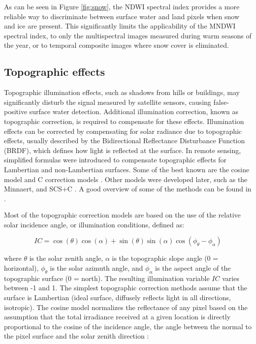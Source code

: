 As can be seen in Figure \ref{fig:snow}, the \gls{NDWI} spectral index provides a more reliable way to discriminate between surface water and land pixels when snow and ice are present. This significantly limits the applicability of the \gls{MNDWI} spectral index, to only the multispectral images measured during warm seasons of the year, or to temporal composite images where snow cover is eliminated.

\subsection{Topographic effects}

Topographic illumination effects, such as shadows from hills or buildings, may significantly disturb the signal measured by satellite sensors, causing false-positive surface water detection. Additional illumination correction, known as topographic correction, is required to compensate for these effects. Illumination effects can be corrected by compensating for solar radiance due to topographic effects, usually described by the Bidirectional Reflectance Disturbance Function (BRDF), which defines how light is reflected at the surface. In remote sensing, simplified formulas were introduced to compensate topographic effects for Lambertian and non-Lambertian surfaces. Some of the best known are the cosine model and C correction models \citet{teillet1982slope}. Other models were developed later, such as the Minnaert, and SCS+C \citet{smith1980lambertian, teillet1982slope}. A good overview of some of the methods can be found in \citet{gao2009simple, soenen2005scs+}. 

Most of the topographic correction models are based on the use of the relative solar incidence angle, or illumination conditions, defined as: 

\begin{equation}
\label{eq:ic}
IC = \cos(\theta) \cos(\alpha) + \sin(\theta) \sin(\alpha) \cos(\phi_{\theta} - \phi_{\alpha})
\end{equation}

where $\theta$ is the solar zenith angle, $\alpha$ is the topographic slope angle (0 = horizontal), $\phi_{\theta}$ is the solar azimuth angle, and $\phi_{\alpha}$ is the aspect angle of the topographic surface (0 = north). The resulting illumination variable $IC$ varies between -1 and 1. The simplest topographic correction methods assume that the surface is Lambertian (ideal surface, diffusely reflects light in all directions, isotropic). The cosine model normalizes the reflectance of any pixel based on the assumption that the total irradiance received at a given location is directly proportional to the cosine of the incidence angle, the angle between the normal to the pixel surface and the solar zenith direction \citet{teillet1982slope}:

